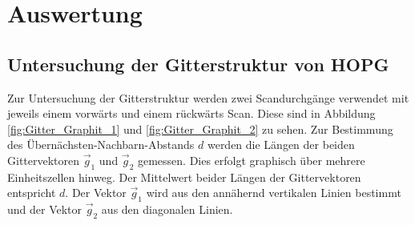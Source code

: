 \section{Auswertung}
\label{sec:Auswertung}
\subsection{Untersuchung der Gitterstruktur von HOPG}
Zur Untersuchung der Gitterstruktur werden zwei Scandurchgänge verwendet mit jeweils einem vorwärts und einem rückwärts Scan. Diese sind in Abbildung \ref{fig:Gitter_Graphit_1} und \ref{fig:Gitter_Graphit_2} zu sehen. Zur Bestimmung des Übernächsten-Nachbarn-Abstands $d$ werden die Längen der beiden Gittervektoren $\vec{g}_1$ und $\vec{g}_2$ gemessen. Dies erfolgt graphisch über mehrere Einheitszellen hinweg. Der Mittelwert beider Längen der Gittervektoren entspricht $d$. Der Vektor $\vec{g}_1$ wird aus den annähernd vertikalen Linien bestimmt und der Vektor $\vec{g}_2$ aus den diagonalen Linien. 
